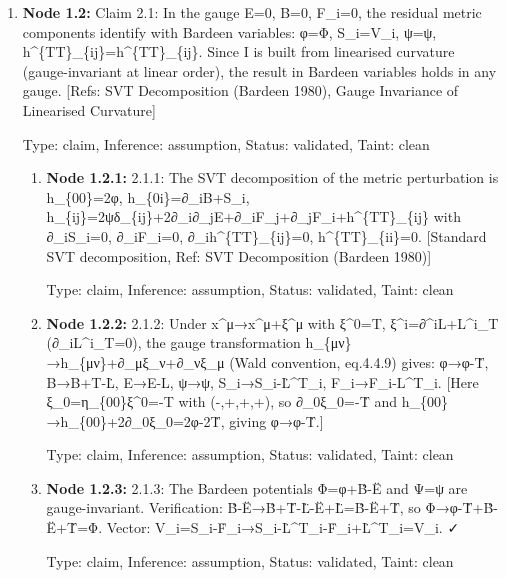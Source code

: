 \begin{enumerate}
\begin{enumerate}
  Type: claim, Inference: assumption, Status: validated, Taint: clean

\end{enumerate}
\item \textbf{Node 1.2:} Claim 2.1: In the gauge E=0, B=0, F\_i=0, the residual metric components identify with Bardeen variables: φ=Φ, S\_i=V\_i, ψ=ψ, h\textasciicircum{}\{TT\}\_\{ij\}=h\textasciicircum{}\{TT\}\_\{ij\}. Since I is built from linearised curvature (gauge-invariant at linear order), the result in Bardeen variables holds in any gauge. [Refs: SVT Decomposition (Bardeen 1980), Gauge Invariance of Linearised Curvature]

  Type: claim, Inference: assumption, Status: validated, Taint: clean

\begin{enumerate}
\item \textbf{Node 1.2.1:} 2.1.1: The SVT decomposition of the metric perturbation is h\_\{00\}=2φ, h\_\{0i\}=∂\_iB+S\_i, h\_\{ij\}=2ψδ\_\{ij\}+2∂\_i∂\_jE+∂\_iF\_j+∂\_jF\_i+h\textasciicircum{}\{TT\}\_\{ij\} with ∂\_iS\_i=0, ∂\_iF\_i=0, ∂\_ih\textasciicircum{}\{TT\}\_\{ij\}=0, h\textasciicircum{}\{TT\}\_\{ii\}=0. [Standard SVT decomposition, Ref: SVT Decomposition (Bardeen 1980)]

  Type: claim, Inference: assumption, Status: validated, Taint: clean

\item \textbf{Node 1.2.2:} 2.1.2: Under x\textasciicircum{}μ→x\textasciicircum{}μ+ξ\textasciicircum{}μ with ξ\textasciicircum{}0=T, ξ\textasciicircum{}i=∂\textasciicircum{}iL+L\textasciicircum{}i\_T (∂\_iL\textasciicircum{}i\_T=0), the gauge transformation h\_\{μν\}→h\_\{μν\}+∂\_μξ\_ν+∂\_νξ\_μ (Wald convention, eq.4.4.9) gives: φ→φ-Ṫ, B→B+T-L̇, E→E-L, ψ→ψ, S\_i→S\_i-L̇\textasciicircum{}T\_i, F\_i→F\_i-L\textasciicircum{}T\_i. [Here ξ\_0=η\_\{00\}ξ\textasciicircum{}0=-T with (-,+,+,+), so ∂\_0ξ\_0=-Ṫ and h\_\{00\}→h\_\{00\}+2∂\_0ξ\_0=2φ-2Ṫ, giving φ→φ-Ṫ.]

  Type: claim, Inference: assumption, Status: validated, Taint: clean

\item \textbf{Node 1.2.3:} 2.1.3: The Bardeen potentials Φ=φ+Ḃ-Ë and Ψ=ψ are gauge-invariant. Verification: Ḃ-Ë→Ḃ+Ṫ-L̈-Ë+L̈=Ḃ-Ë+Ṫ, so Φ→φ-Ṫ+Ḃ-Ë+Ṫ=Φ. Vector: V\_i=S\_i-Ḟ\_i→S\_i-L̇\textasciicircum{}T\_i-Ḟ\_i+L̇\textasciicircum{}T\_i=V\_i. ✓

  Type: claim, Inference: assumption, Status: validated, Taint: clean


\end{enumerate}
\end{enumerate}
